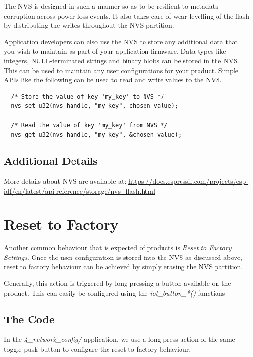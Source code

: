 \documentclass[main.tex]{subfiles}
\begin{document}
The NVS is designed in such a manner so as to be resilient to metadata corruption across power loss events. It also takes care of wear-levelling of the flash by distributing the writes throughout the NVS partition.

Application developers can also use the NVS to store any additional data that you wish to maintain as part of your application firmware. Data types like integers, NULL-terminated strings and binary blobs can be stored in the NVS. This can be used to maintain any user configurations for your product. Simple APIs like the following can be used to read and write values to the NVS.

\begin{verbatim}
  /* Store the value of key 'my_key' to NVS */
  nvs_set_u32(nvs_handle, "my_key", chosen_value);

  /* Read the value of key 'my_key' from NVS */
  nvs_get_u32(nvs_handle, "my_key", &chosen_value);
\end{verbatim}


\subsection{Additional Details}

More details about NVS are available at: \url{https://docs.espressif.com/projects/esp-idf/en/latest/api-reference/storage/nvs_flash.html}

\section{Reset to Factory}
Another common behaviour that is expected of products is \textit{Reset to Factory Settings}. Once the user configuration is stored into the NVS as discussed above, reset to factory behaviour can be achieved by simply erasing the NVS partition.

Generally, this action is triggered by long-pressing a button available on the product. This can easily be configured using the \textit{iot\_button\_*()} functions

\subsection{The Code}\label{sec:reset_to_factory}
In the \textit{4\_network\_config/} application, we use a long-press action of the same toggle push-button to configure the reset to factory behaviour.
\end{document}
